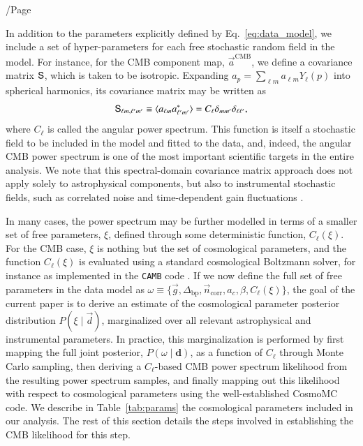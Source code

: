 /Page\documentclass[twocolumn]{aa}
\renewcommand{\d}[0]{\vec{d}}
\newcommand{\n}[0]{\vec{n}}
\renewcommand{\a}[0]{\vec{a}}
\newcommand{\g}[0]{\vec{g}}
\renewcommand{\S}[0]{\tens{S}}
\begin{document}
In addition to the parameters explicitly defined by
Eq.~\eqref{eq:data_model}, we include a set of hyper-parameters for each
free stochastic random field in the model. For instance, for the CMB
component map, $\a^{\mathrm{CMB}}$, we define a covariance
matrix $\S$, which is taken to be isotropic. Expanding
$a_p=\sum_{\ell m} a_{\ell m}Y_\ell(p)$ into spherical harmonics,
its covariance matrix may be written as
\begin{equation}
  \label{eq:cov_harm}
  \S_{\ell m,\ell'm'}\equiv\langle a_{\ell m}a^{*}_{\ell'm'}\rangle=C_{\ell}
  \delta_{mm'}\delta_{\ell\ell'},
\end{equation}
where $C_\ell$ is called the angular power spectrum. This function
is itself a stochastic field to be included in the model and fitted to
the data, and, indeed, the angular CMB power spectrum is one of the
most important scientific targets in the entire analysis. We note that
this spectral-domain covariance matrix approach does not apply solely to
astrophysical components, but also to instrumental stochastic fields,
such as correlated noise \citep{bp06} and time-dependent gain fluctuations \citep{bp07}.

In many cases, the power spectrum may be further modelled in terms of
a smaller set of free parameters, $\xi$, defined through some
deterministic function, $C_{\ell}(\xi)$. For the CMB case, $\xi$ is
nothing but the set of cosmological parameters, and the function $C_{\ell}(\xi)$ is
evaluated using a standard cosmological Boltzmann solver, for instance as implemented
in the \texttt{CAMB} code \citep{Lewis:1999bs}. If we now define the
full set of free parameters in the data model as $\omega \equiv
\lbrace\g,\Delta_{\mathrm{bp}},\n_{\mathrm{corr}},a_c,\beta,
C_{\ell}(\xi)\rbrace$, the goal of the current paper is to derive an
estimate of the cosmological parameter posterior distribution
$P(\xi\mid\d)$, marginalized over all relevant astrophysical and
instrumental parameters. In practice, this marginalization is
performed by first mapping the full joint posterior, $P(\omega
\mid\mathbf{d})$, as a function of $C_{\ell}$ through Monte Carlo
sampling, then deriving a $C_{\ell}$-based CMB power spectrum likelihood from
the resulting power spectrum samples, and finally mapping out this
likelihood with respect to cosmological parameters using the
well-established CosmoMC \citep{cosmomc} code. We describe in
Table~\ref{tab:params} the cosmological parameters included in our analysis. 
The rest of this section details the steps involved in establishing 
the CMB likelihood for this step.
\end{document}
